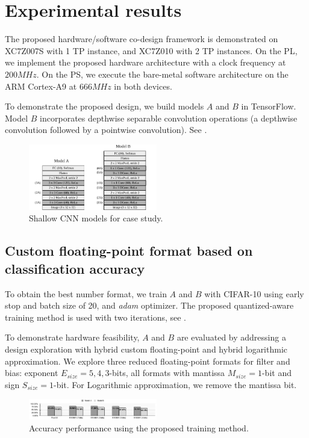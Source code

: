 \section{Experimental results}
\label{sec:experimental_results}
The proposed hardware/software co-design framework is demonstrated on XC7Z007S with 1 TP instance, and XC7Z010 with 2 TP instances. On the PL, we implement the proposed hardware architecture with a clock frequency at $200 MHz$. On the PS, we execute the bare-metal software architecture on the ARM Cortex-A9 at $666MHz$ in both devices.

To demonstrate the proposed design, we build models $A$ and $B$ in TensorFlow. Model $B$ incorporates depthwise separable convolution operations (a depthwise convolution followed by a pointwise convolution). See .

\begin{figure}[t!]
	\centering
	\includegraphics[width=0.5\textwidth]{../figures/models.pdf}
	\caption{Shallow CNN models for case study.}
	\label{fig:models}
\end{figure}

\subsection{Custom floating-point format based on classification accuracy}
To obtain the best number format, we train $A$ and $B$ with CIFAR-10 using early stop and batch size of 20, and \emph{adam} optimizer. The proposed quantized-aware training method is used with two iterations, see .

To demonstrate hardware feasibility, $A$ and $B$ are evaluated by addressing a design exploration with hybrid custom floating-point and hybrid logarithmic approximation. We explore three reduced floating-point formats for filter and bias: exponent $E_{size} = 5, 4, 3$-bits, all formats with mantissa $M_{size} = 1$-bit and sign $S_{size} = 1$-bit. For Logarithmic approximation, we remove the mantissa bit.

\begin{figure}[t!]
	\centering
	\includegraphics[width=0.5\textwidth]{../figures/all_models_accuracy.pdf}
	\caption{Accuracy performance using the proposed training method.}
	\label{fig:accuracy}
\end{figure}

